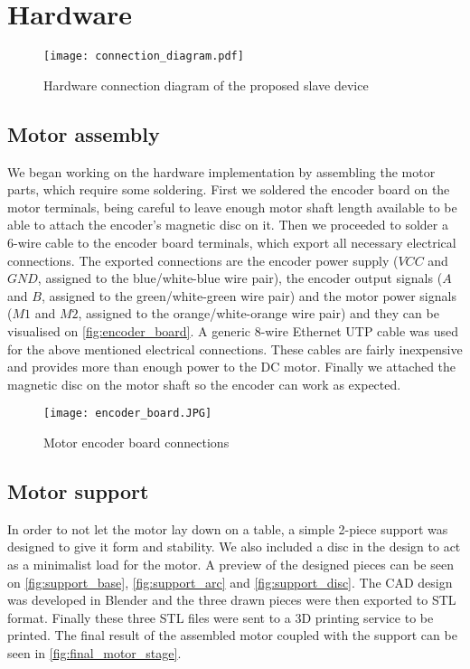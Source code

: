 \section{Hardware} \label{sec:hardware-devel}

\begin{figure}[htp]
	\centering
	\texttt{[image: connection\_diagram.pdf]}
	\caption{Hardware connection diagram of the proposed slave device}
	\label{fig:connection_diagram}
\end{figure}

\subsection{Motor assembly}
We began working on the hardware implementation by assembling the motor parts, which require some soldering.
First we soldered the encoder board on the motor terminals, being careful to leave enough motor shaft length available to be able to attach the encoder's magnetic disc on it.
Then we proceeded to solder a 6-wire cable to the encoder board terminals, which export all necessary electrical connections.
The exported connections are the encoder power supply ($VCC$ and $GND$, assigned to the blue/white-blue wire pair), the encoder output signals ($A$ and $B$, assigned to the green/white-green wire pair) and the motor power signals ($M1$ and $M2$, assigned to the orange/white-orange wire pair) and they can be visualised on \autoref{fig:encoder_board}.
A generic 8-wire Ethernet UTP cable was used for the above mentioned electrical connections.
These cables are fairly inexpensive and provides more than enough power to the DC motor.
Finally we attached the magnetic disc on the motor shaft so the encoder can work as expected.

\begin{figure}[htp]
	\centering
	\texttt{[image: encoder\_board.JPG]}
	\caption{Motor encoder board connections}
	\label{fig:encoder_board}
\end{figure}

\subsection{Motor support}
In order to not let the motor lay down on a table, a simple 2-piece support was designed to give it form and stability.
We also included a disc in the design to act as a minimalist load for the motor.
A preview of the designed pieces can be seen on \autoref{fig:support_base}, \autoref{fig:support_arc} and \autoref{fig:support_disc}.
The CAD design was developed in Blender \cite{sw:blender} and the three drawn pieces were then exported to STL format.
Finally these three STL files were sent to a 3D printing service to be printed.
The final result of the assembled motor coupled with the support can be seen in \autoref{fig:final_motor_stage}.

